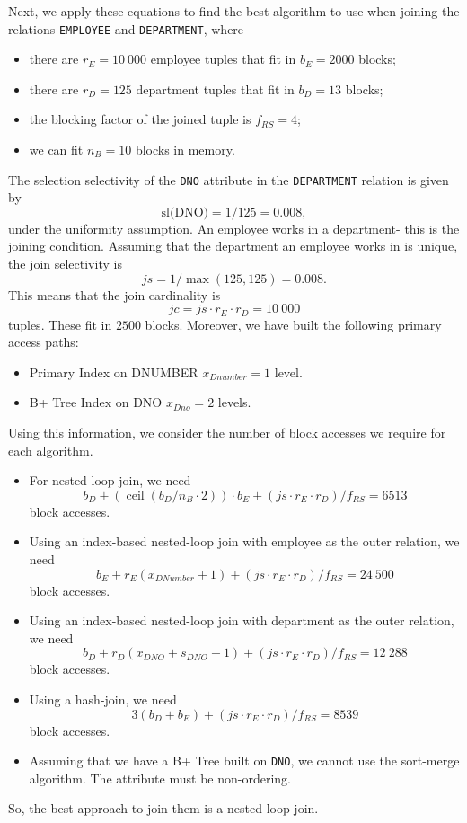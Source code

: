 \documentclass[a4paper, openany]{memoir}
\theoremstyle{definition}
\theoremstyle{plain}
\begin{document}
Next, we apply these equations to find the best algorithm to use when joining the relations \texttt{EMPLOYEE} and \texttt{DEPARTMENT}, where
\begin{itemize}
    \item there are $r_E = 10 \ 000$ employee tuples that fit in $b_E = 2000$ blocks;
    \item there are $r_D = 125$ department tuples that fit in $b_D = 13$ blocks;
    \item the blocking factor of the joined tuple is $f_{RS} = 4$;
    \item we can fit $n_B = 10$ blocks in memory.
\end{itemize}
The selection selectivity of the \texttt{DNO} attribute in the \texttt{DEPARTMENT} relation is given by
\[\text{sl(DNO)} = 1/125 = 0.008,\]
under the uniformity assumption. An employee works in a department- this is the joining condition. Assuming that the department an employee works in is unique, the join selectivity is
\[\textit{js} = 1/\max(125, 125) = 0.008.\]
This means that the join cardinality is
\[\textit{jc} = \textit{js} \cdot r_E \cdot r_D = 10 \ 000\]
tuples. These fit in $2500$ blocks. Moreover, we have built the following primary access paths:
\begin{itemize}
    \item Primary Index on DNUMBER $x_{Dnumber} = 1$ level.
    \item B+ Tree Index on DNO $x_{Dno} = 2$ levels.
\end{itemize}
Using this information, we consider the number of block accesses we require for each algorithm.
\begin{itemize}
    \item For nested loop join, we need
    \[b_D + (\operatorname{ceil}(b_D / n_B \cdot 2)) \cdot b_E + (\textit{js} \cdot r_E \cdot r_D)/f_{RS} = 6513\]
    block accesses.
    \item Using an index-based nested-loop join with employee as the outer relation, we need
    \[b_E + r_E (x_{DNumber} + 1) + (\textit{js} \cdot r_E \cdot r_D)/f_{RS} = 24 \ 500\]
    block accesses.
    \item Using an index-based nested-loop join with department as the outer relation, we need
    \[b_D + r_D (x_{DNO} + s_{DNO} + 1) + (\textit{js} \cdot r_E \cdot r_D)/f_{RS} = 12 \ 288\]
    block accesses.
    \item Using a hash-join, we need
    \[3(b_D + b_E) + (\textit{js} \cdot r_E \cdot r_D)/f_{RS} = 8539\]
    block accesses.
    \item Assuming that we have a B+ Tree built on \texttt{DNO}, we cannot use the sort-merge algorithm. The attribute must be non-ordering.
\end{itemize}
So, the best approach to join them is a nested-loop join.
\end{document}
